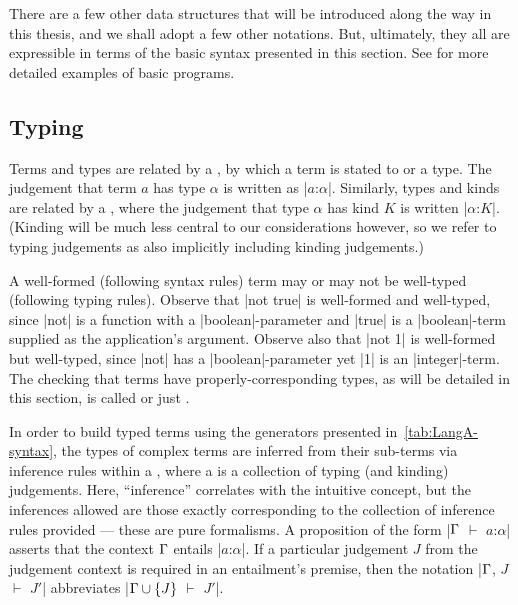 There are a few other data structures that will be introduced along the way in this thesis, and we shall adopt a few other notations.
But, ultimately, they all are expressible in terms of the basic syntax presented in this section.
See \prelude{\LangA} for more detailed examples of basic \LangA programs.

\subsection{Typing}
\label{sec:LangA-typing}

Terms and types are related by a , by which a term is stated to  or  a type.
The judgement that term $a$ has type $α$ is written as \code|$a$:$α$|.
Similarly, types and kinds are related by a , where the judgement that type $α$ has kind $K$ is written \code|$α$:$K$|.
(Kinding will be much less central to our considerations however, so we refer to typing judgements as also implicitly including kinding judgements.)

A well-formed (following syntax rules) term may or may not be well-typed (following typing rules).
Observe that \code|not true| is well-formed and well-typed, since \code|not| is a function with a \code|boolean|-parameter and \code|true| is a \code|boolean|-term supplied as the application's argument.
Observe also that \code|not 1| is well-formed but  well-typed, since \code|not| has a \code|boolean|-parameter yet \code|1| is an \code|integer|-term.
The checking that terms have properly-corresponding types, as will be detailed in this section, is called  or just .

In order to build typed terms using the generators presented in~\ref{tab:LangA-syntax}, the types of complex terms are inferred from their sub-terms via inference rules within a , where a  is a collection of typing (and kinding) judgements.
Here, ``inference'' correlates with the intuitive concept, but the  inferences allowed are those exactly corresponding to the collection of inference rules provided --- these are pure formalisms.
A proposition of the form \code|$\Gamma$ $⊢$ $a$:$α$| asserts that the context $\Gamma$ entails \code|$a$:$α$|.
If a particular judgement $J$ from the judgement context is required in an entailment's premise, then the notation \code|$\Gamma$, $J$ $⊢$ $J'$| abbreviates \code|$\Gamma \cup \left\{ J \right\}$ $⊢$ $J'$|.

